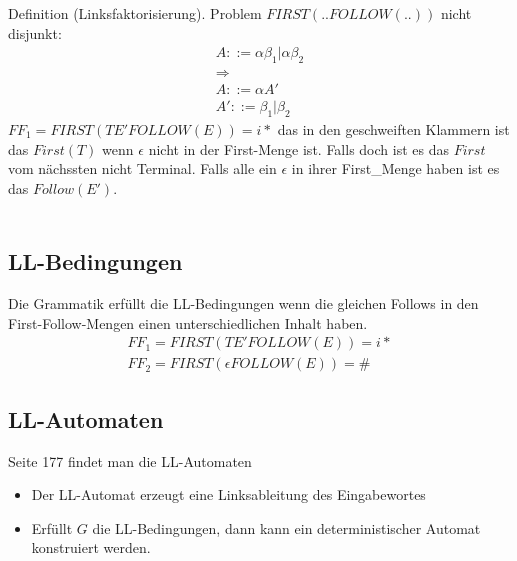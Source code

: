 \documentclass[
  ngerman
  ,12pt
  ,pdftex
]{article}
\begin{document}
Definition (Linksfaktorisierung). Problem $FIRST(..FOLLOW(..))$ nicht disjunkt:
\begin{align*}
  A::=\alpha \beta_1  |  \alpha \beta_2 \\
  \Longrightarrow\\
  A::= \alpha A'\\
  A'::= \beta_1  |  \beta_2
\end{align*}
$FF_1 = FIRST(T E' FOLLOW(E))={i*}$ das in den geschweiften Klammern ist das $First(T)$ wenn $\epsilon$ nicht in der First-Menge ist. 
Falls doch ist es das $First$ vom nächssten nicht Terminal. 
Falls alle ein $\epsilon$ in ihrer First\_Menge haben ist es das $Follow(E')$.\\
\\
\subsection{LL-Bedingungen \label{ref}}
Die Grammatik erfüllt die LL-Bedingungen wenn die gleichen Follows in den First-Follow-Mengen einen unterschiedlichen Inhalt haben.
\begin{align*}
  FF_1 = FIRST(T E' FOLLOW(E))={i*}\\
  FF_2 = FIRST(\epsilon FOLLOW(E))={\#}
\end{align*}



\subsection{LL-Automaten}
Seite 177 findet man die LL-Automaten \\
\begin{itemize}
  \item Der LL-Automat erzeugt eine Linksableitung des Eingabewortes
  \item Erfüllt $G$ die LL-Bedingungen, dann kann ein deterministischer Automat konstruiert werden.
\end{itemize}
\end{document}
